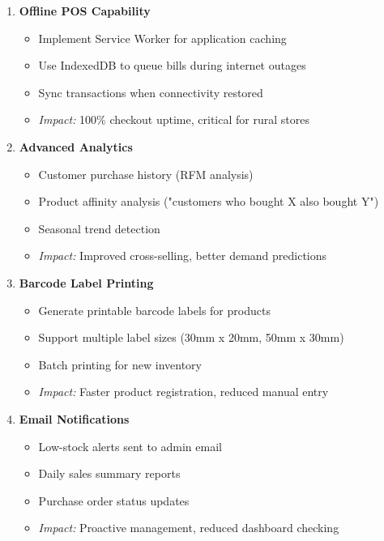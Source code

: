 \begin{enumerate}[leftmargin=*]
    \item \textbf{Offline POS Capability}
    \begin{itemize}
        \item Implement Service Worker for application caching
        \item Use IndexedDB to queue bills during internet outages
        \item Sync transactions when connectivity restored
        \item \textit{Impact:} 100\% checkout uptime, critical for rural stores
    \end{itemize}
    
    \item \textbf{Advanced Analytics}
    \begin{itemize}
        \item Customer purchase history (RFM analysis)
        \item Product affinity analysis ("customers who bought X also bought Y")
        \item Seasonal trend detection
        \item \textit{Impact:} Improved cross-selling, better demand predictions
    \end{itemize}
    
    \item \textbf{Barcode Label Printing}
    \begin{itemize}
        \item Generate printable barcode labels for products
        \item Support multiple label sizes (30mm x 20mm, 50mm x 30mm)
        \item Batch printing for new inventory
        \item \textit{Impact:} Faster product registration, reduced manual entry
    \end{itemize}
    
    \item \textbf{Email Notifications}
    \begin{itemize}
        \item Low-stock alerts sent to admin email
        \item Daily sales summary reports
        \item Purchase order status updates
        \item \textit{Impact:} Proactive management, reduced dashboard checking
    \end{itemize}
\end{enumerate}

